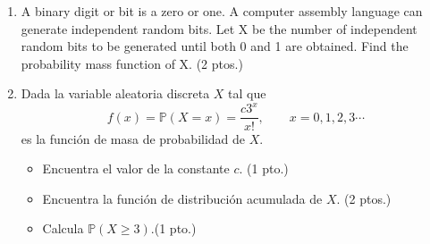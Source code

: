 \documentclass[a4paper,10pt]{report}
\begin{document}
\begin{enumerate}
\item A binary digit or bit is a zero or one. A computer assembly language can generate  independent random bits. Let X be the number of independent random bits to be  generated until both 0 and 1 are obtained. Find the probability mass function of  X. \hfill{(2 ptos.)}
\item  Dada la variable aleatoria discreta $X$ tal que  $$f(x)=\mathbb{P}(X=x)=\frac{c3^x}{x!},\qquad x=0,1,2,3\cdots$$   es la funci\'on de masa de  probabilidad de $X$.
\begin{itemize}
	\item Encuentra el valor de la constante $c$. \hfill{(1 pto.)}
	\item Encuentra la funci\'on de distribuci\'on acumulada de $X$. \hfill{(2 ptos.)}
	\item Calcula $\mathbb{P}(X\geq 3)$.\hfill{(1 pto.)}
\end{itemize} 


	\end{enumerate}
\end{document}
